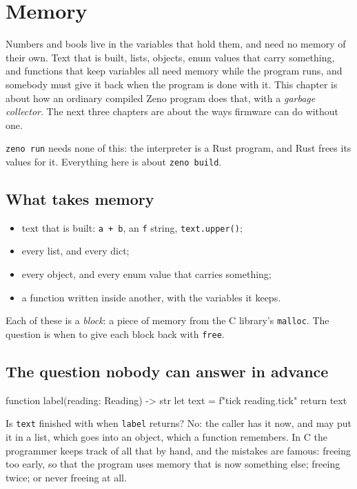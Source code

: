\chapter{Memory}\label{ch-memory}

Numbers and bools live in the variables that hold them, and need no
memory of their own. Text that is built, lists, objects, enum values
that carry something, and functions that keep variables all need
memory while the program runs, and somebody must give it back when the
program is done with it. This chapter is about how an ordinary
compiled Zeno program does that, with a \emph{garbage collector}. The
next three chapters are about the ways firmware can do without one.

\verb|zeno run| needs none of this: the interpreter is a Rust program,
and Rust frees its values for it. Everything here is about
\verb|zeno build|.

\section{What takes memory}

\begin{itemize}
\item text that is built: \verb|a + b|, an \verb|f| string, \verb|text.upper()|;
\item every list, and every dict;
\item every object, and every enum value that carries something;
\item a function written inside another, with the variables it keeps.
\end{itemize}

Each of these is a \emph{block}: a piece of memory from the C
library's \verb|malloc|. The question is when to give each block back
with \verb|free|.

\section{The question nobody can answer in advance}

\begin{zenofrag}
function label(reading: Reading) -> str {
    let text = f"tick {reading.tick}"
    return text
}
\end{zenofrag}

Is \verb|text| finished with when \verb|label| returns? No: the caller
has it now, and may put it in a list, which goes into an object, which
a function remembers. In C the programmer keeps track of all that by
hand, and the mistakes are famous: freeing too early, so that the
program uses memory that is now something else; freeing twice; or
never freeing at all.

